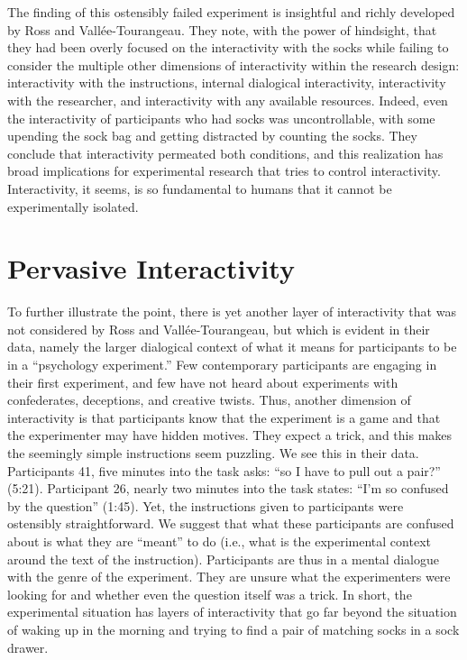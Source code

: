 \documentclass[twocolumn, serif, reflection, authordate]{jote-article}
\begin{document}
The finding of this ostensibly failed experiment is insightful and
richly developed by Ross and Vallée-Tourangeau. They note, with the
power of hindsight, that they had been overly focused on the
interactivity with the socks while failing to consider the multiple
other dimensions of interactivity within the research design:
interactivity with the instructions, internal dialogical interactivity,
interactivity with the researcher, and interactivity with any available
resources. Indeed, even the interactivity of participants who had socks
was uncontrollable, with some upending the sock bag and getting
distracted by counting the socks. They conclude that interactivity
permeated both conditions, and this realization has broad implications
for experimental research that tries to control interactivity.
Interactivity, it seems, is so fundamental to humans that it cannot be
experimentally isolated.

\section*{Pervasive Interactivity}

To further illustrate the point, there is yet another layer of
interactivity that was not considered by Ross and Vallée-Tourangeau, but
which is evident in their data, namely the larger dialogical context of
what it means for participants to be in a ``psychology experiment.'' Few
contemporary participants are engaging in their first experiment, and
few have not heard about experiments with confederates, deceptions, and
creative twists. Thus, another dimension of interactivity is that
participants know that the experiment is a game and that the
experimenter may have hidden motives. They expect a trick, and this
makes the seemingly simple instructions seem puzzling. We see this in
their data. Participants 41, five minutes into the task asks: ``so I
have to pull out a pair?'' (5:21). Participant 26, nearly two minutes
into the task states: ``I'm so confused by the question'' (1:45). Yet,
the instructions given to participants were ostensibly straightforward.
We suggest that what these participants are confused about is what they
are ``meant'' to do (i.e., what is the experimental context around the
text of the instruction). Participants are thus in a mental dialogue
with the genre of the experiment. They are unsure what the experimenters
were looking for and whether even the question itself was a trick. In
short, the experimental situation has layers of interactivity that go
far beyond the situation of waking up in the morning and trying to find
a pair of matching socks in a sock drawer.
\end{document}

